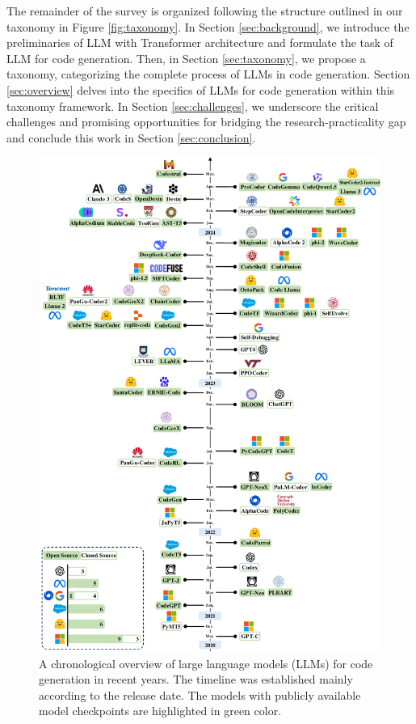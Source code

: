 The remainder of the survey is organized following the structure outlined in our taxonomy in Figure \ref{fig:taxonomy}. In Section \ref{sec:background}, we introduce the preliminaries of LLM with Transformer architecture and formulate the task of LLM for code generation. 
Then, in Section \ref{sec:taxonomy}, we propose a taxonomy, categorizing the complete process of LLMs in code generation. Section \ref{sec:overview} delves into the specifics of LLMs for code generation within this taxonomy framework. In Section \ref{sec:challenges}, we underscore the critical challenges and promising opportunities for bridging the research-practicality gap and conclude this work in Section \ref{sec:conclusion}. 

\begin{figure}[p!]
\centering
\includegraphics[width=0.97\linewidth]{images/codellm_timeline_v4.pdf}
\caption{A chronological overview of large language models (LLMs) for code generation in recent years. The timeline was established mainly according to the release date. The models with publicly available model checkpoints are highlighted in green color.}
\label{fig:timeline}
\end{figure}